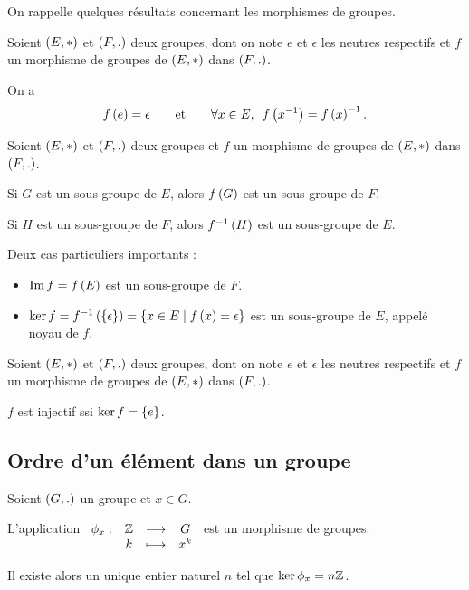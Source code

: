 On rappelle quelques résultats concernant les morphismes de groupes.

\begin{prop}
Soient \(\groupe{E}[*]\) et \(\groupe{F}[.]\) deux groupes, dont on note \(e\) et \(\epsilon\) les neutres respectifs et \(f\) un morphisme de groupes de \(\groupe{E}[*]\) dans \(\groupe{F}[.]\).

On a \[f\paren{e}=\epsilon\qquad\text{et}\qquad\quantifs{\forall x\in E}f\paren{x\inv}=f\paren{x}\inv.\]
\end{prop}

\begin{prop}
Soient \(\groupe{E}[*]\) et \(\groupe{F}[.]\) deux groupes et \(f\) un morphisme de groupes de \(\groupe{E}[*]\) dans \(\groupe{F}[.]\).

Si \(G\) est un sous-groupe de \(E\), alors \(f\left(G\right)\) est un sous-groupe de \(F\).

Si \(H\) est un sous-groupe de \(F\), alors \(f^{-1}\left(H\right)\) est un sous-groupe de \(E\).
\end{prop}

Deux cas particuliers importants :

\begin{itemize}
    \item \(\operatorname{Im} f=f\left(E\right)\) est un sous-groupe de \(F\). \\
    \item \(\ker f=f^{-1}\left(\left\lbrace\epsilon\right\rbrace\right)=\left\lbrace x\in E\;\middle|\; f\left(x\right)=\epsilon\right\rbrace\) est un sous-groupe de \(E\), appelé noyau de \(f\).
\end{itemize}

\begin{prop}
Soient \(\groupe{E}[*]\) et \(\groupe{F}[.]\) deux groupes, dont on note \(e\) et \(\epsilon\) les neutres respectifs et \(f\) un morphisme de groupes de \(\groupe{E}[*]\) dans \(\groupe{F}[.]\).

\(f\) est injectif ssi \(\ker f=\left\lbrace e\right\rbrace\).
\end{prop}

\subsection{Ordre d'un élément dans un groupe}

\begin{prop}
Soient \(\groupe{G}[.]\) un groupe et \(x\in G\).

L'application \(\begin{array}[t]{cccc}\phi_x : & \mathbb{Z} & \longrightarrow & G \\ & k & \longmapsto & x^k\end{array}\) est un morphisme de groupes.

Il existe alors un unique entier naturel \(n\) tel que \(\ker\phi_x=n\mathbb{Z}\).
\end{prop}

